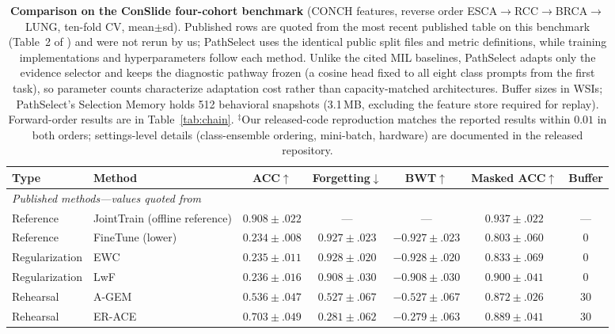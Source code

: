 \documentclass{article}
\begin{document}
\begin{table}[t]
\centering\footnotesize
\caption{\textbf{Comparison on the ConSlide four-cohort benchmark} \cite{huang2023conslide} (CONCH features, reverse order ESCA$\rightarrow$RCC$\rightarrow$BRCA$\rightarrow$LUNG, ten-fold CV, mean$\pm$sd). Published rows are quoted from the most recent published table on this benchmark (Table~2 of \cite{gou2025qpmil}) and were not rerun by us; PathSelect uses the identical public split files and metric definitions, while training implementations and hyperparameters follow each method. Unlike the cited MIL baselines, PathSelect adapts only the evidence selector and keeps the diagnostic pathway frozen (a cosine head fixed to all eight class prompts from the first task), so parameter counts characterize adaptation cost rather than capacity-matched architectures. Buffer sizes in WSIs; PathSelect's Selection Memory holds 512 behavioral snapshots (3.1\,MB, excluding the feature store required for replay). Forward-order results are in Table~\ref{tab:chain}. $^\ddagger$Our released-code reproduction matches the reported results within $0.01$ in both orders; settings-level details (class-ensemble ordering, mini-batch, hardware) are documented in the released repository.}
\label{tab:sota}
\begin{tabular}{llccccc}
\toprule
Type & Method & ACC$\uparrow$ & Forgetting$\downarrow$ & BWT$\uparrow$ & Masked ACC$\uparrow$ & Buffer \\
\midrule
\multicolumn{7}{l}{\emph{Published methods---values quoted from \cite{gou2025qpmil}}} \\
Reference & JointTrain (offline reference) & $0.908{\pm}.022$ & --- & --- & $0.937{\pm}.022$ & --- \\
Reference & FineTune (lower) & $0.234{\pm}.008$ & $0.927{\pm}.023$ & $-0.927{\pm}.023$ & $0.803{\pm}.060$ & 0 \\
Regularization & EWC \cite{kirkpatrick2017ewc} & $0.235{\pm}.011$ & $0.928{\pm}.020$ & $-0.928{\pm}.020$ & $0.833{\pm}.069$ & 0 \\
Regularization & LwF \cite{li2017lwf} & $0.236{\pm}.016$ & $0.908{\pm}.030$ & $-0.908{\pm}.030$ & $0.900{\pm}.041$ & 0 \\
Rehearsal & A-GEM \cite{chaudhry2019agem} & $0.536{\pm}.047$ & $0.527{\pm}.067$ & $-0.527{\pm}.067$ & $0.872{\pm}.026$ & 30 \\
Rehearsal & ER-ACE \cite{caccia2022erace} & $0.703{\pm}.049$ & $0.281{\pm}.062$ & $-0.279{\pm}.063$ & $0.889{\pm}.041$ & 30 \\

\end{tabular}
\end{table}
\end{document}
